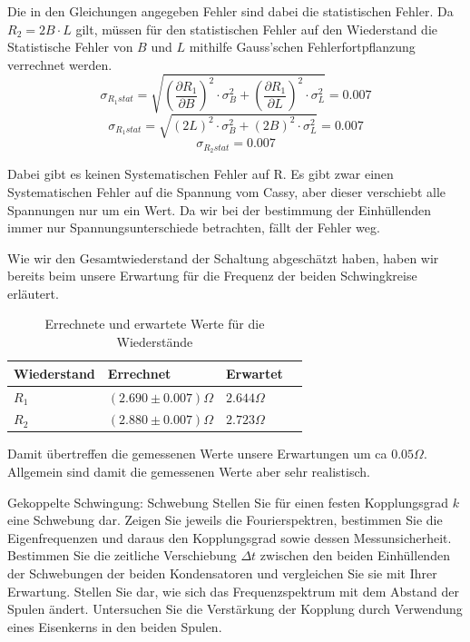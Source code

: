 \documentclass[twoside]{protokoll}
\begin{document}
Die in den Gleichungen angegeben Fehler sind dabei die statistischen Fehler.
Da $R_2 = 2 B \cdot L$ gilt, müssen für den statistischen Fehler auf den Wiederstand die Statistische Fehler von $B$ und $L$ mithilfe Gauss'schen Fehlerfortpflanzung verrechnet werden.
\begin{equation}
    \sigma_{R_1 stat} = \sqrt{ \left( \frac{\partial R_1}{\partial B} \right)^2 \cdot \sigma_{B}^2 + \left( \frac{\partial R_1}{\partial L} \right)^2 \cdot \sigma_{L}^2} 
    = 0.007
\end{equation}
\begin{equation}
    \sigma_{R_1 stat} = \sqrt{ \left( 2L \right)^2 \cdot \sigma_{B}^2 + \left( 2 B \right)^2 \cdot \sigma_{L}^2} 
    = 0.007
\end{equation}
\begin{equation}
    \sigma_{R_2 stat} = 0.007
\end{equation}

Dabei gibt es keinen Systematischen Fehler auf R. Es gibt zwar einen Systematischen Fehler auf die Spannung vom Cassy, aber dieser verschiebt alle Spannungen nur um ein Wert.
Da wir bei der bestimmung der Einhüllenden immer nur Spannungsunterschiede betrachten, fällt der Fehler weg.
 
 
Wie wir den Gesamtwiederstand der Schaltung abgeschätzt haben, haben wir bereits beim unsere Erwartung für die Frequenz der beiden Schwingkreise erläutert.
\begin{table}[H]
    \centering
    \begin{tabularx}{1\textwidth}{X X X X} %
        \toprule
        \textbf{Wiederstand} & \textbf{Errechnet} & \textbf{Erwartet} \\
        \midrule
        $R_1$ & $(2.690 \pm 0.007) \Omega$ & $2.644 \Omega$ \\
        $R_2$ & $(2.880 \pm 0.007) \Omega$ & $2.723 \Omega$ \\
        \bottomrule
    \end{tabularx}
    \caption{Errechnete und erwartete Werte für die Wiederstände}
\end{table}
Damit übertreffen die gemessenen Werte unsere Erwartungen um ca $0.05 \Omega$.
Allgemein sind damit die gemessenen Werte aber sehr realistisch.
 
 
\begin{aufgabe}{Gekoppelte Schwingung: Schwebung}
  Stellen Sie für einen festen Kopplungsgrad $k$ eine Schwebung
  dar. Zeigen Sie jeweils die Fourierspektren, bestimmen Sie die
  Eigenfrequenzen und daraus den Kopplungsgrad sowie dessen
  Messunsicherheit. Bestimmen Sie die zeitliche Verschiebung
  $\Delta{}t$ zwischen den beiden Einhüllenden der Schwebungen der
  beiden Kondensatoren und vergleichen Sie sie mit Ihrer
  Erwartung. Stellen Sie dar, wie sich das Frequenzspektrum mit dem
  Abstand der Spulen ändert. Untersuchen Sie die Verstärkung der
  Kopplung durch Verwendung eines Eisenkerns in den beiden Spulen.
\end{aufgabe}
\end{document}
